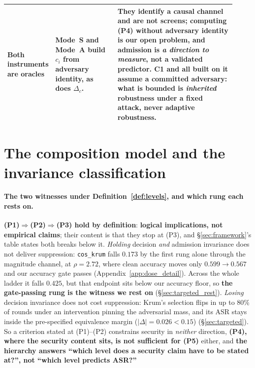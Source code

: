 \documentclass{article}
\begin{document}
\begin{table}[h]
\begin{tabular}{@{}p{0.095\linewidth}p{0.285\linewidth}p{0.545\linewidth}@{}}
\addlinespace
\textbf{Both instruments are oracles} & Mode~S and Mode~A build $c_i$ from adversary identity, as does $\Delta_c$. & They \textbf{identify a causal channel and are not screens}; computing (P4) without adversary identity is our open problem, and admission is \emph{a direction to measure}, not a validated predictor. C1 and all built on it assume a \textbf{committed} adversary: what is bounded is \emph{inherited} robustness under a fixed attack, \textbf{never adaptive robustness}. \\
\bottomrule
\end{tabular}
\end{table}

\section{The composition model and the invariance classification}
\label{app:framework}

\paragraph{The two witnesses under Definition~\ref{def:levels}, and which rung each rests on.} \textbf{(P1)$\Rightarrow$(P2)$\Rightarrow$(P3) hold by definition}: \textbf{logical implications, not empirical claims}; their content is that they stop at (P3), and \S\ref{sec:framework}'s table states both breaks below it. \emph{Holding} decision \emph{and} admission invariance does not deliver suppression: \texttt{cos\_krum} falls $0.173$ by the first rung alone through the magnitude channel, at $\rho{=}2.72$, where clean accuracy moves only $0.599 \to 0.567$ and our accuracy gate passes (Appendix~\ref{app:dose_detail}). Across the whole ladder it falls $0.425$, but that endpoint sits below our accuracy floor, so \textbf{the gate-passing rung is the witness we rest on} (\S\ref{sec:targeted_rest}). \emph{Losing} decision invariance does not cost suppression: Krum's selection flips in up to $80\%$ of rounds under an intervention pinning the adversarial mass, and its ASR stays inside the pre-specified equivalence margin ($|\Delta|{=}0.026 < 0.15$) (\S\ref{sec:targeted}). So a criterion stated at (P1)--(P2) constrains security in \emph{neither} direction, \textbf{(P4), where the security content sits, is not sufficient for (P5)} either, and \textbf{the hierarchy answers ``which level does a security claim have to be stated at?'', not ``which level predicts ASR?''}
\end{document}
